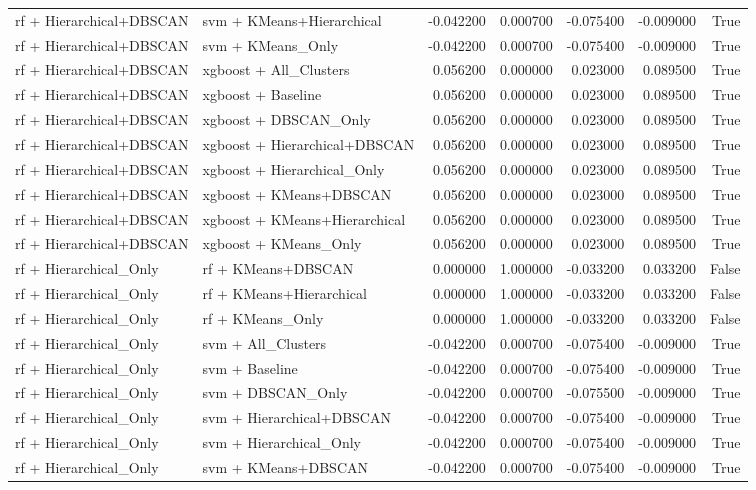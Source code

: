 \begin{tabular}{llrrrrr}
rf + Hierarchical+DBSCAN & svm + KMeans+Hierarchical & -0.042200 & 0.000700 & -0.075400 & -0.009000 & True \\
rf + Hierarchical+DBSCAN & svm + KMeans_Only & -0.042200 & 0.000700 & -0.075400 & -0.009000 & True \\
rf + Hierarchical+DBSCAN & xgboost + All_Clusters & 0.056200 & 0.000000 & 0.023000 & 0.089500 & True \\
rf + Hierarchical+DBSCAN & xgboost + Baseline & 0.056200 & 0.000000 & 0.023000 & 0.089500 & True \\
rf + Hierarchical+DBSCAN & xgboost + DBSCAN_Only & 0.056200 & 0.000000 & 0.023000 & 0.089500 & True \\
rf + Hierarchical+DBSCAN & xgboost + Hierarchical+DBSCAN & 0.056200 & 0.000000 & 0.023000 & 0.089500 & True \\
rf + Hierarchical+DBSCAN & xgboost + Hierarchical_Only & 0.056200 & 0.000000 & 0.023000 & 0.089500 & True \\
rf + Hierarchical+DBSCAN & xgboost + KMeans+DBSCAN & 0.056200 & 0.000000 & 0.023000 & 0.089500 & True \\
rf + Hierarchical+DBSCAN & xgboost + KMeans+Hierarchical & 0.056200 & 0.000000 & 0.023000 & 0.089500 & True \\
rf + Hierarchical+DBSCAN & xgboost + KMeans_Only & 0.056200 & 0.000000 & 0.023000 & 0.089500 & True \\
rf + Hierarchical_Only & rf + KMeans+DBSCAN & 0.000000 & 1.000000 & -0.033200 & 0.033200 & False \\
rf + Hierarchical_Only & rf + KMeans+Hierarchical & 0.000000 & 1.000000 & -0.033200 & 0.033200 & False \\
rf + Hierarchical_Only & rf + KMeans_Only & 0.000000 & 1.000000 & -0.033200 & 0.033200 & False \\
rf + Hierarchical_Only & svm + All_Clusters & -0.042200 & 0.000700 & -0.075400 & -0.009000 & True \\
rf + Hierarchical_Only & svm + Baseline & -0.042200 & 0.000700 & -0.075400 & -0.009000 & True \\
rf + Hierarchical_Only & svm + DBSCAN_Only & -0.042200 & 0.000700 & -0.075500 & -0.009000 & True \\
rf + Hierarchical_Only & svm + Hierarchical+DBSCAN & -0.042200 & 0.000700 & -0.075400 & -0.009000 & True \\
rf + Hierarchical_Only & svm + Hierarchical_Only & -0.042200 & 0.000700 & -0.075400 & -0.009000 & True \\
rf + Hierarchical_Only & svm + KMeans+DBSCAN & -0.042200 & 0.000700 & -0.075400 & -0.009000 & True \\

\end{tabular}
